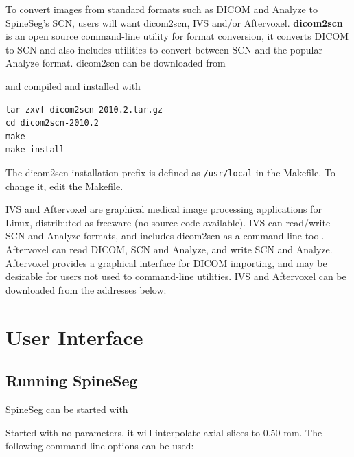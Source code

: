 \documentclass[12pt]{report}
\begin{document}
To convert images from standard formats such as DICOM and Analyze to SpineSeg's SCN, 
users will want dicom2scn, IVS and/or Aftervoxel. \textbf{dicom2scn} is an
open source command-line utility for format conversion, it converts
DICOM to SCN and also includes utilities to convert between SCN and
the popular Analyze format. dicom2scn can be downloaded from


and compiled and installed with 

\begin{verbatim}
tar zxvf dicom2scn-2010.2.tar.gz
cd dicom2scn-2010.2
make
make install
\end{verbatim}

The dicom2scn installation prefix is defined as \texttt{/usr/local} in
the Makefile. To change it, edit the Makefile.

IVS and Aftervoxel are graphical medical image processing applications
for Linux, distributed as freeware (no source code available). IVS can
read/write SCN and Analyze formats, and includes dicom2scn as a
command-line tool. Aftervoxel can read DICOM, SCN and Analyze, and write SCN
and Analyze. Aftervoxel provides a graphical interface for DICOM importing,
and may be desirable for users not used to command-line utilities. IVS and
Aftervoxel can be downloaded from the addresses below:



\chapter{User Interface}
\label{c.ui}

\section{Running SpineSeg}

SpineSeg can be started with


Started with no parameters, it will interpolate axial slices to 0.50 mm. The
following command-line options can be used:
\end{document}
